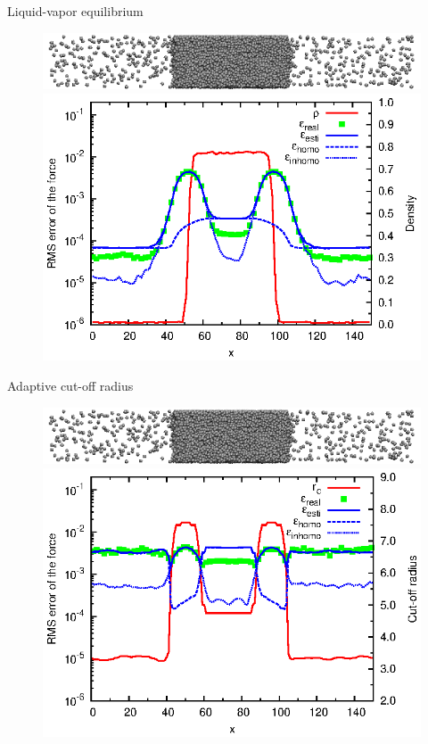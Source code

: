 \documentclass{beamer}
\begin{document}
\begin{frame}{Liquid-vapor equilibrium}
  \begin{figure}
    \centering
    \includegraphics[scale=1]{figs/t0.85-n16000-rc07.5uni/confout-02.eps}\\
    \includegraphics[]{figs/t0.85-n16000-rc07.5uni/error-uniform.eps}
  \end{figure}
\end{frame}

\begin{frame}{Adaptive cut-off radius}
  \begin{figure}
    \centering
    \includegraphics[scale=1]{figs/t0.85-n16000-rc07.5uni/confout-02.eps}\\
    \includegraphics[]{figs/t0.85-n16000-adapt-e0.0045-extend/rcut-and-error.eps}
  \end{figure}
\end{frame}
\end{document}
